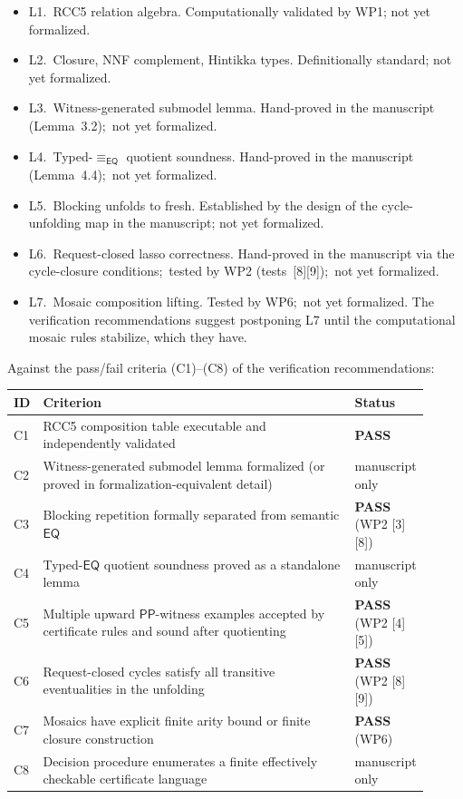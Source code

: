 \documentclass[11pt]{article}
\newcommand{\EQ}{\mathsf{EQ}}
\newcommand{\PP}{\mathsf{PP}}
\newcommand{\eqrel}{\equiv_{\EQ}}
\newcommand{\PASS}{\textcolor{black!70!green}{\textbf{PASS}}}
\begin{document}
\begin{itemize}[leftmargin=2em]
  \item L1.~RCC5 relation algebra.  Computationally validated by
    WP1; not yet formalized.
  \item L2.~Closure, NNF complement, Hintikka types.  Definitionally
    standard; not yet formalized.
  \item L3.~Witness-generated submodel lemma.  Hand-proved in the
    manuscript (Lemma~3.2);\ not yet formalized.
  \item L4.~Typed-\(\eqrel\) quotient soundness.  Hand-proved in
    the manuscript (Lemma~4.4);\ not yet formalized.
  \item L5.~Blocking unfolds to fresh.  Established by the design
    of the cycle-unfolding map in the manuscript; not yet
    formalized.
  \item L6.~Request-closed lasso correctness.  Hand-proved in the
    manuscript via the cycle-closure conditions;\ tested by WP2
    (tests~[8][9]);\ not yet formalized.
  \item L7.~Mosaic composition lifting.  Tested by WP6;\ not yet
    formalized.  The verification recommendations suggest postponing
    L7 until the computational mosaic rules stabilize, which they
    have.
\end{itemize}

Against the pass/fail criteria (C1)--(C8) of the verification
recommendations:
\begin{center}\small
\begin{tabular}{p{0.05\linewidth} p{0.78\linewidth} p{0.08\linewidth}}
\toprule
ID & Criterion & Status \\
\midrule
C1 & RCC5 composition table executable and independently validated & \PASS{} \\
C2 & Witness-generated submodel lemma formalized
     (or proved in formalization-equivalent detail) & manuscript only \\
C3 & Blocking repetition formally separated from semantic \(\EQ\)
     & \PASS{} (WP2 [3][8]) \\
C4 & Typed-\(\EQ\) quotient soundness proved as a standalone lemma
     & manuscript only \\
C5 & Multiple upward \(\PP\)-witness examples accepted by certificate
     rules and sound after quotienting & \PASS{} (WP2 [4][5]) \\
C6 & Request-closed cycles satisfy all transitive eventualities in
     the unfolding & \PASS{} (WP2 [8][9]) \\
C7 & Mosaics have explicit finite arity bound or finite closure
     construction & \PASS{} (WP6) \\
C8 & Decision procedure enumerates a finite effectively checkable
     certificate language & manuscript only \\
\bottomrule
\end{tabular}
\end{center}
\end{document}
